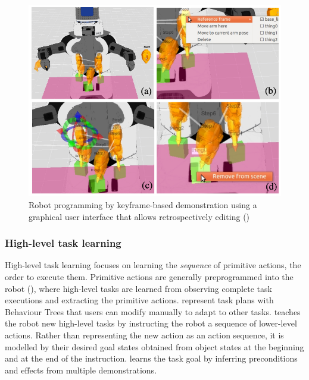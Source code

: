 \begin{figure}[!h]
	\centering
	\includegraphics[width=0.7\linewidth]{figures/alexandrova-gui}
	\caption{Robot programming by keyframe-based demonstration using a graphical user interface that allows retrospectively editing (\cite{alexandrova2014robot})}
	\label{fig:alexandrova-gui}
\end{figure} 

\subsubsection{High-level task learning}\label{ssec:highlevel}
High-level task learning focuses on learning the \textit{sequence} of primitive actions, \ie the order to execute them.
Primitive actions are generally preprogrammed into the robot (\cite{peppoloni2014ros}), where high-level tasks are learned from observing complete task executions and extracting the primitive actions.
\citet{paxton2017costar} represent task plans with Behaviour Trees that users can modify manually to adapt to other tasks.
\cite{she2014teaching} teaches the robot new high-level tasks by instructing the robot a sequence of lower-level actions.
Rather than representing the new action as an action sequence, it is modelled by their desired goal states obtained from object states at the beginning and at the end of the instruction.
\cite{ahmadzadeh2015learning} learns the task goal by inferring preconditions and effects from multiple demonstrations.

